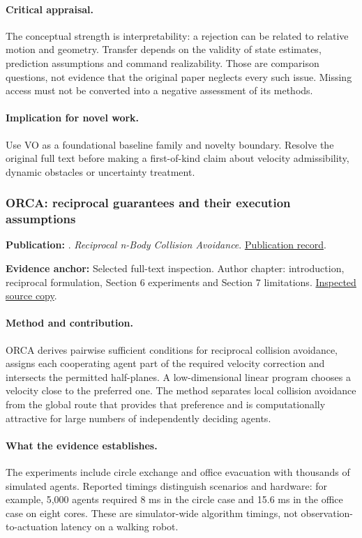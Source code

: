 \paragraph{Critical appraisal.} The conceptual strength is interpretability: a rejection can be related to relative motion and geometry. Transfer depends on the validity of state estimates, prediction assumptions and command realizability. Those are comparison questions, not evidence that the original paper neglects every such issue. Missing access must not be converted into a negative assessment of its methods.

\paragraph{Implication for novel work.} Use VO as a foundational baseline family and novelty boundary. Resolve the original full text before making a first-of-kind claim about velocity admissibility, dynamic obstacles or uncertainty treatment.

\subsubsection{ORCA: reciprocal guarantees and their execution assumptions}\label{paper:orca}
\textbf{Publication:} \citet{orca}. \emph{Reciprocal n-Body Collision Avoidance}. \href{https://doi.org/10.1007/978-3-642-19457-3_1}{Publication record}.

\textbf{Evidence anchor:} Selected full-text inspection. Author chapter: introduction, reciprocal formulation, Section 6 experiments and Section 7 limitations. \href{https://gamma.cs.unc.edu/ORCA/publications/ORCA.pdf}{Inspected source copy}.

\paragraph{Method and contribution.} ORCA derives pairwise sufficient conditions for reciprocal collision avoidance, assigns each cooperating agent part of the required velocity correction and intersects the permitted half-planes. A low-dimensional linear program chooses a velocity close to the preferred one. The method separates local collision avoidance from the global route that provides that preference and is computationally attractive for large numbers of independently deciding agents.

\paragraph{What the evidence establishes.} The experiments include circle exchange and office evacuation with thousands of simulated agents. Reported timings distinguish scenarios and hardware: for example, 5,000 agents required 8 ms in the circle case and 15.6 ms in the office case on eight cores. These are simulator-wide algorithm timings, not observation-to-actuation latency on a walking robot.

